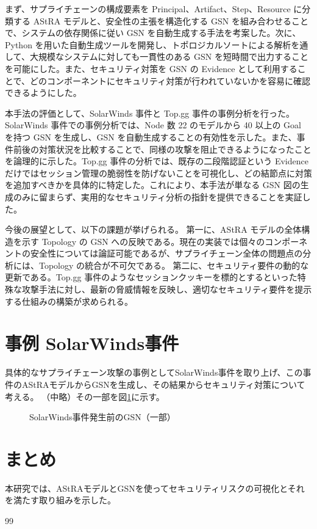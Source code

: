\documentclass[paper]{ieicej} %
\begin{document}
まず、サプライチェーンの構成要素を Principal、Artifact、Step、Resource に分類する AStRA モデルと、安全性の主張を構造化する GSN を組み合わせることで、システムの依存関係に従い GSN を自動生成する手法を考案した。次に、Python を用いた自動生成ツールを開発し、トポロジカルソートによる解析を通して、大規模なシステムに対しても一貫性のある GSN を短時間で出力することを可能にした。また、セキュリティ対策を GSN の Evidence として利用することで、どのコンポーネントにセキュリティ対策が行われていないかを容易に確認できるようにした。

本手法の評価として、SolarWinds 事件と Top.gg 事件の事例分析を行った。SolarWinds 事件での事例分析では、Node 数 22 のモデルから 40 以上の Goal を持つ GSN を生成し、GSN を自動生成することの有効性を示した。また、事件前後の対策状況を比較することで、同様の攻撃を阻止できるようになったことを論理的に示した。Top.gg 事件の分析では、既存の二段階認証という Evidence だけではセッション管理の脆弱性を防げないことを可視化し、どの結節点に対策を追加すべきかを具体的に特定した。これにより、本手法が単なる GSN 図の生成のみに留まらず、実用的なセキュリティ分析の指針を提供できることを実証した。

今後の展望として、以下の課題が挙げられる。
第一に、AStRA モデルの全体構造を示す Topology の GSN への反映である。現在の実装では個々のコンポーネントの安全性については論証可能であるが、サプライチェーン全体の問題点の分析には、Topology の統合が不可欠である。
第二に、セキュリティ要件の動的な更新である。Top.gg 事件のようなセッションクッキーを標的とするといった特殊な攻撃手法に対し、最新の脅威情報を反映し、適切なセキュリティ要件を提示する仕組みの構築が求められる。


\section{事例 SolarWinds事件}
具体的なサプライチェーン攻撃の事例としてSolarWinds事件を取り上げ、この事件のAStRAモデルからGSNを生成し、その結果からセキュリティ対策について考える。
（中略）その一部を図\ref{fig:solar3}に示す。

\begin{figure}[htbp]
    \centering
    \caption{SolarWinds事件発生前のGSN（一部）}
    \label{fig:solar3}
\end{figure}

\section{まとめ}
本研究では、AStRAモデルとGSNを使ってセキュリティリスクの可視化とそれを満たす取り組みを示した。

\begin{thebibliography}{99}
\end{thebibliography}

\begin{biography}
\end{biography}
\end{document}
